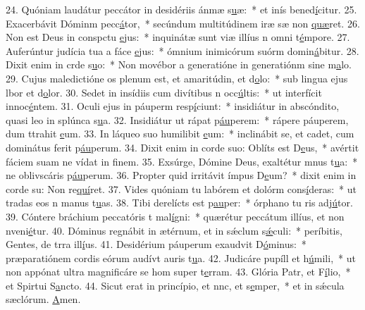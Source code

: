 24. Quóniam laudátur peccátor in desidériis ánmæ s\uline{u}æ:~* et inís bened\uline{í}citur.
25. Exacerbávit Dóminm pecc\uline{á}tor,~* secúndum multitúdinem iræ sæ non \uline{quæ}ret.
26. Non est Deus in conspctu \uline{e}jus:~* inquinátæ sunt viæ illíus n omni t\uline{é}mpore.
27. Auferúntur judícia tua a fáce \uline{e}jus:~* ómnium inimicórum suórm domin\uline{á}bitur.
28. Dixit enim in crde s\uline{u}o:~* Non movébor a generatióne in generatiónm sine m\uline{a}lo.
29. Cujus maledictióne os plenum est, et amaritúdin, et d\uline{o}lo:~* sub lingua ejus lbor et d\uline{o}lor.
30. Sedet in insídiis cum divítibus n occ\uline{ú}ltis:~* ut interfícit innoc\uline{é}ntem.
31. Oculi ejus in páuperm resp\uline{í}ciunt:~* insidiátur in abscóndito, quasi leo in splúnca s\uline{u}a.
32. Insidiátur ut rápat p\uline{áu}perem:~* rápere páuperem, dum ttrahit \uline{e}um.
33. In láqueo suo humilibit \uline{e}um:~* inclinábit se, et cadet, cum dominátus ferit p\uline{áu}perum.
34. Dixit enim in corde suo: Oblíts est D\uline{e}us,~* avértit fáciem suam ne vídat in f\uline{i}nem.
35. Exsúrge, Dómine Deus, exaltétur mnus t\uline{u}a:~* ne oblivscáris p\uline{áu}perum.
36. Propter quid irritávit ímpus D\uline{e}um?~* dixit enim in corde su: Non re\uline{quí}ret.
37. Vides quóniam tu labórem et dolórm cons\uline{í}deras:~* ut tradas eos n manus t\uline{u}as.
38. Tibi derelícts est p\uline{au}per:~* órphano tu ris adj\uline{ú}tor.
39. Cóntere bráchium peccatóris t mal\uline{í}gni:~* quærétur peccátum illíus, et non nveni\uline{é}tur.
40. Dóminus regnábit in ætérnum, et in sǽclum s\uline{ǽ}culi:~* períbitis, Gentes, de trra ill\uline{í}us.
41. Desidérium páuperum exaudvit D\uline{ó}minus:~* præparatiónem cordis eórum audívt auris t\uline{u}a.
42. Judicáre pupíll et h\uline{ú}mili,~* ut non appónat ultra magnificáre se hom super t\uline{e}rram.
43. Glória Patr, et F\uline{í}lio,~* et Spirtui S\uline{a}ncto.
44. Sicut erat in princípio, et nnc, et s\uline{e}mper,~* et in sǽcula sæclórum. \uline{A}men.

